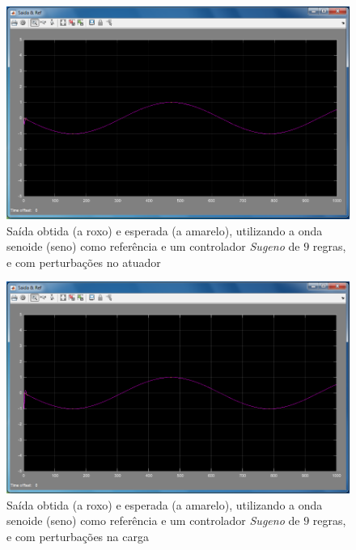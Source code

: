 \documentclass{article}
\begin{document}
\begin{figure}[h]
  \centering
      \includegraphics[scale=0.3]{Images/Sugeno_9_sin_actuator.png}
  \caption{Saída obtida (a roxo) e esperada (a amarelo), utilizando a onda senoide (seno) como referência e um controlador \emph{Sugeno} de $9$ regras, e com perturbações no atuador}
\end{figure}

\begin{figure}[h]
  \centering
      \includegraphics[scale=0.3]{Images/Sugeno_9_sin_charge.png}
  \caption{Saída obtida (a roxo) e esperada (a amarelo), utilizando a onda senoide (seno) como referência e um controlador \emph{Sugeno} de $9$ regras, e com perturbações na carga}
\end{figure}
\end{document}
